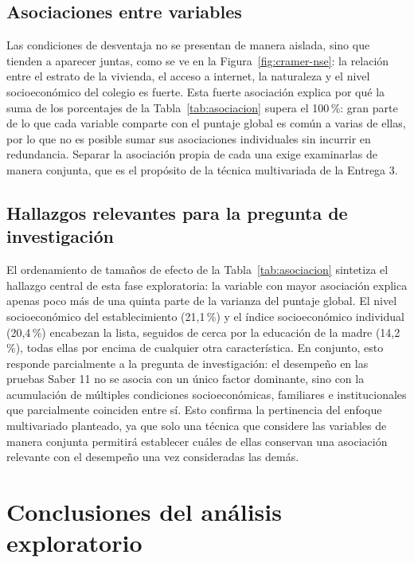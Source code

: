 \documentclass[12pt]{article}
\begin{document}
\subsection{Asociaciones entre variables}
\label{sec:asociaciones}
 
Las condiciones de desventaja no se presentan de manera aislada, sino que tienden a aparecer
juntas, como se ve en la Figura~\ref{fig:cramer-nse}: la relación entre el estrato de la
vivienda, el acceso a internet, la naturaleza y el nivel socioeconómico del colegio es fuerte.
Esta fuerte asociación explica por qué la suma de los porcentajes de la
Tabla~\ref{tab:asociacion} supera el 100\,\%: gran parte de lo que cada variable comparte con
el puntaje global es común a varias de ellas, por lo que no es posible sumar sus asociaciones
individuales sin incurrir en redundancia. Separar la asociación propia de cada una exige
examinarlas de manera conjunta, que es el propósito de la técnica multivariada de la Entrega 3.
 
\subsection{Hallazgos relevantes para la pregunta de investigación}
 
El ordenamiento de tamaños de efecto de la Tabla~\ref{tab:asociacion} sintetiza el
hallazgo central de esta fase exploratoria: la variable con mayor asociación explica apenas
poco más de una quinta parte de la varianza del puntaje global. El nivel socioeconómico
del establecimiento (21{,}1\,\%) y el índice socioeconómico individual (20{,}4\,\%)
encabezan la lista, seguidos de cerca por la educación de la madre (14{,}2\,\%), todas ellas por encima de cualquier otra característica. En conjunto, esto responde parcialmente a la pregunta de investigación: el desempeño en las pruebas Saber 11 no se asocia con un único factor dominante, sino con la acumulación de múltiples condiciones socioeconómicas, familiares e institucionales que parcialmente coinciden entre sí. Esto confirma la pertinencia del enfoque multivariado planteado, ya que solo una técnica que considere las variables de manera conjunta permitirá establecer cuáles de ellas conservan una asociación relevante con el desempeño una vez consideradas las demás.

\section{Conclusiones del análisis exploratorio}
\end{document}
